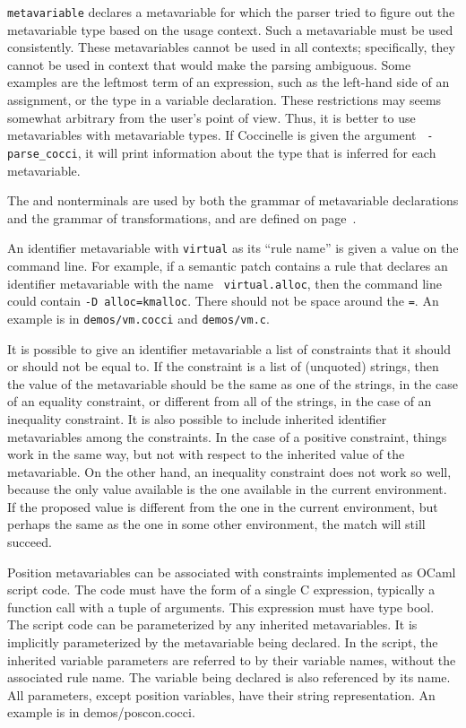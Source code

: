 {\tt metavariable} declares a metavariable for which the parser tried to
figure out the metavariable type based on the usage context.  Such a
metavariable must be used consistently.  These metavariables cannot be used
in all contexts; specifically, they cannot be used in context that would
make the parsing ambiguous.  Some examples are the leftmost term of an
expression, such as the left-hand side of an assignment, or the type in a
variable declaration.  These restrictions may seems somewhat arbitrary from
the user's point of view.  Thus, it is better to use metavariables with
metavariable types.  If Coccinelle is given the argument {\tt
  -parse\_cocci}, it will print information about the type that is inferred
for each metavariable.

The  and  nonterminals are used by both the grammar of
metavariable declarations and the grammar of transformations, and are
defined on page~\pageref{types}.

An identifier metavariable with {\tt virtual} as its ``rule name'' is given
a value on the command line.  For example, if a semantic patch contains a
rule that declares an identifier metavariable with the name {\tt
  virtual.alloc}, then the command line could contain {\tt -D
  alloc=kmalloc}.  There should not be space around the {\tt =}.  An
example is in {\tt demos/vm.cocci} and {\tt demos/vm.c}.

It is possible to give an identifier metavariable a list of constraints
that it should or should not be equal to.  If the constraint is a list of
(unquoted) strings, then the value of the metavariable should be the same
as one of the strings, in the case of an equality constraint, or different
from all of the strings, in the case of an inequality constraint.  It is
also possible to include inherited identifier metavariables among the
constraints.  In the case of a positive constraint, things work in the same
way, but not with respect to the inherited value of the metavariable.  On
the other hand, an inequality constraint does not work so well, because the
only value available is the one available in the current environment.  If
the proposed value is different from the one in the current environment,
but perhaps the same as the one in some other environment, the match will
still succeed.

Position metavariables can be associated with constraints implemented as
OCaml script code.  The code must have the form of a single C expression,
typically a function call with a tuple of arguments.  This expression must
have type bool.  The script code can be parameterized by any inherited
metavariables.  It is implicitly parameterized by the metavariable being
declared.  In the script, the inherited variable parameters are referred to
by their variable names, without the associated rule name.  The variable
being declared is also referenced by its name.  All parameters, except
position variables, have their string representation.  An example is in
demos/poscon.cocci.

